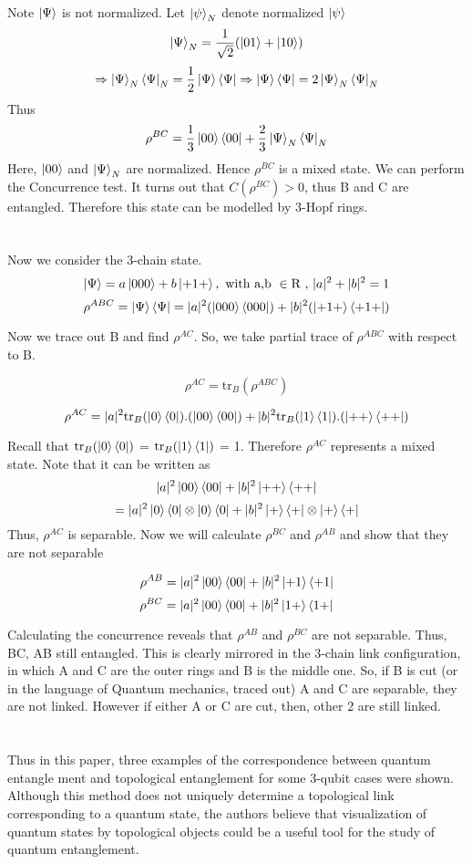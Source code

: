 \documentclass{article}
\begin{document}
Note $\ket{\Psi}$ is not normalized.
Let $\ket{\psi}_N$ denote normalized $\ket{\psi}$
\[
\ket{\Psi}_N = \frac{1}{\sqrt{2}}(\ket{01}+\ket{10})
\]
\[
\Rightarrow \ket{\Psi}_N\bra{\Psi}_N= \frac{1}{2}\ket{\Psi}\bra{\Psi}
\Rightarrow \ket{\Psi}\bra{\Psi} = 2\ket{\Psi}_N\bra{\Psi}_N
\]
Thus 
\[
\rho^{BC} = \frac{1}{3}\ket{00}\bra{00}+\frac{2}{3}\ket{\Psi}_N\bra{\Psi}_N
\]
Here, $\ket{00}$ and $\ket{\Psi}_N$ are normalized. Hence $\rho^{BC}$ is a mixed state. We can perform the Concurrence test. It turns out that $C(\rho^{BC})>0$, thus B and C are entangled. Therefore this state can be modelled by 3-Hopf rings.

\section{}

Now we consider the 3-chain state. 
\[
\ket{\Psi} = a\ket{000} + b\ket{+1+},  \text{ with a,b } \in \text{R , } |a|^2+|b|^2=1
\]
\[
\rho^{ABC}=\ket{\Psi}\bra{\Psi} = |a|^2 (\ket{000}\bra{000})+|b|^2(\ket{+1+}\bra{+1+})
\]

Now we trace out B and find $\rho^{AC} $. So, we take partial trace of $\rho^{ABC}$ with respect to B.

\[\rho^{AC} = \mathrm{tr}_B(\rho^{ABC})\]

\[
\rho^{AC} = |a|^2\mathrm{tr}_B(\ket{0}\bra{0}).(\ket{00}\bra{00}) + |b|^2\mathrm{tr}_B(\ket{1}\bra{1}).(\ket{++}\bra{++})
\]

Recall that $\mathrm{tr}_B(\ket{0}\bra{0})$ = $\mathrm{tr}_B(\ket{1}\bra{1})$ = 1. 
Therefore $\rho^{AC}$ represents a mixed state. Note that it can be written as
\[
|a|^2\ket{00}\bra{00}+|b|^2\ket{++}\bra{++}
\]
\[
=|a|^2\ket{0}\bra{0}\otimes\ket{0}\bra{0}+|b|^2\ket{+}\bra{+}\otimes\ket{+}\bra{+}
\]
Thus, $\rho^{AC}$ is separable. 
Now we will calculate $\rho^{BC}$ and $\rho^{AB}$ and show that they are not separable

\[
\rho^{AB}=|a|^2\ket{00}\bra{00}+|b|^2\ket{+1}\bra{+1}
\]
\[
\rho^{BC}=|a|^2\ket{00}\bra{00}+|b|^2\ket{1+}\bra{1+}
\]

Calculating the concurrence reveals that $\rho^{AB}$ and $\rho^{BC}$ are not separable. Thus, BC, AB still entangled. This is clearly mirrored in the 3-chain link configuration, in which A and C are the outer rings and B is the middle one. So, if B is cut (or in the language of Quantum mechanics, traced out) A and C are separable, they are not linked. However if either A or C are cut, then, other 2 are still linked.
\section{}

Thus in this paper,  three examples of the correspondence between quantum entangle
ment and topological entanglement for some 3-qubit cases were shown. Although this  method does not uniquely determine a topological link corresponding to a quantum state, the authors believe that visualization of quantum states by topological objects could be a useful tool for the study of quantum entanglement.
\end{document}
